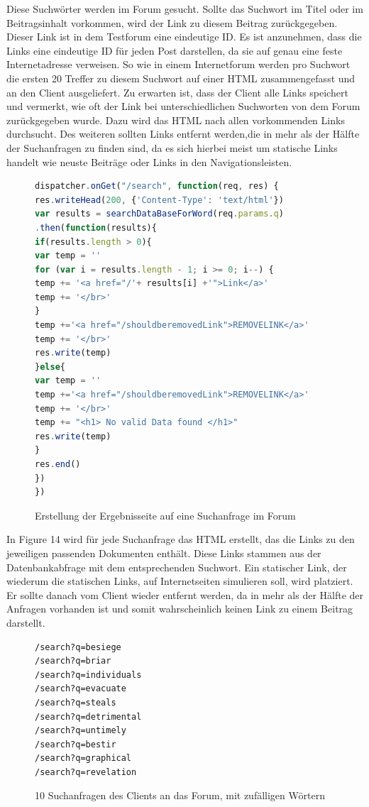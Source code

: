 Diese Suchwörter werden im Forum gesucht. Sollte das Suchwort im Titel oder im Beitragsinhalt vorkommen, wird der Link zu diesem Beitrag zurückgegeben. Dieser Link ist in dem Testforum eine eindeutige ID. Es ist anzunehmen, dass die Links eine eindeutige ID für jeden Post darstellen, da sie auf genau eine feste Internetadresse verweisen. So wie in einem Internetforum werden pro Suchwort die ersten 20 Treffer zu diesem Suchwort auf einer HTML zusammengefasst und an den Client ausgeliefert. Zu erwarten ist, dass der Client alle Links speichert und vermerkt, wie oft der Link bei unterschiedlichen Suchworten von dem Forum zurückgegeben wurde. Dazu wird das HTML nach allen vorkommenden Links durchsucht. Des weiteren sollten Links entfernt werden,die in mehr als der Hälfte der Suchanfragen zu finden sind, da es sich hierbei meist um statische Links handelt wie neuste Beiträge oder Links in den Navigationsleisten.
\newpage

\begin{figure}[h!]
\begin{lstlisting}[language=JavaScript]
dispatcher.onGet("/search", function(req, res) {
res.writeHead(200, {'Content-Type': 'text/html'})
var results = searchDataBaseForWord(req.params.q)
.then(function(results){
if(results.length > 0){
var temp = ''
for (var i = results.length - 1; i >= 0; i--) {
temp += '<a href="/'+ results[i] +'">Link</a>'
temp += '</br>'
}
temp +='<a href="/shouldberemovedLink">REMOVELINK</a>'
temp += '</br>'
res.write(temp)
}else{
var temp = ''
temp +='<a href="/shouldberemovedLink">REMOVELINK</a>'
temp += '</br>'
temp += "<h1> No valid Data found </h1>"
res.write(temp)
}
res.end() 
}) 
})
\end{lstlisting}
\caption{Erstellung der Ergebnisseite auf eine Suchanfrage im Forum}
\end{figure}

In Figure 14 wird für jede Suchanfrage das HTML erstellt, das die Links zu den jeweiligen passenden Dokumenten enthält. Diese Links stammen aus der Datenbankabfrage mit dem entsprechenden Suchwort.
Ein statischer Link, der wiederum die statischen Links, auf Internetseiten simulieren soll, wird platziert. Er sollte danach vom Client wieder entfernt werden, da in mehr als der Hälfte der Anfragen vorhanden ist und somit wahrscheinlich keinen Link zu einem Beitrag darstellt.

\begin{figure}[h!]
\begin{lstlisting}[language=HTML5]
/search?q=besiege
/search?q=briar
/search?q=individuals
/search?q=evacuate
/search?q=steals
/search?q=detrimental
/search?q=untimely
/search?q=bestir
/search?q=graphical
/search?q=revelation
\end{lstlisting}
\caption{10 Suchanfragen des Clients an das Forum, mit zufälligen Wörtern}
\end{figure}

